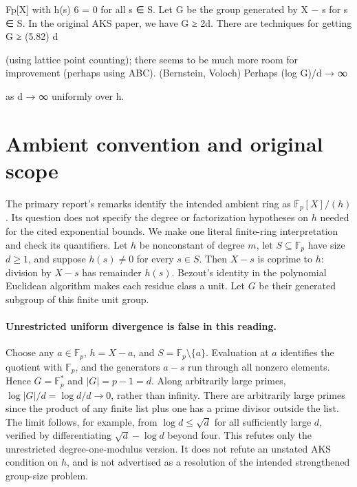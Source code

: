 \documentclass[11pt]{article}
\begin{document}
Fp[X] with h(s) 6 = 0 for all s ∈ S. Let G be the group generated by X − s for s ∈ S. In the original AKS paper, we have G ≥ 2d. There are techniques for getting G ≥ (5.82) d

(using lattice point counting); there seems to be much more room for improvement (perhaps using ABC). (Bernstein, Voloch) Perhaps (log G)/d → ∞

as d → ∞ uniformly over h.

\section{Ambient convention and original scope}
The primary report's remarks identify the intended ambient ring as
$\mathbb F_p[X]/(h)$. Its question does not specify the degree or
factorization hypotheses on $h$ needed for the cited exponential
bounds. We make one literal finite-ring interpretation and check its
quantifiers. Let $h$ be nonconstant of degree $m$, let $S\subseteq
\mathbb F_p$ have size $d\ge1$, and suppose $h(s)\ne0$ for every
$s\in S$. Then $X-s$ is coprime to $h$: division by $X-s$ has
remainder $h(s)$. Bezout's identity in the polynomial Euclidean
algorithm makes each residue class a unit. Let $G$ be their generated
subgroup of this finite unit group.

\paragraph{Unrestricted uniform divergence is false in this reading.}
Choose any $a\in\mathbb F_p$, $h=X-a$, and
$S=\mathbb F_p\setminus\{a\}$. Evaluation at $a$ identifies the
quotient with $\mathbb F_p$, and the generators $a-s$ run through
all nonzero elements. Hence $G=\mathbb F_p^*$ and $|G|=p-1=d$.
Along arbitrarily large primes,
$\log|G|/d=\log d/d\to0$, rather than infinity.
There are arbitrarily large primes since the product of any finite
list plus one has a prime divisor outside the list. The limit follows,
for example, from $\log d\le\sqrt d$ for all sufficiently large $d$,
verified by differentiating $\sqrt d-\log d$ beyond four.
This refutes only the unrestricted degree-one-modulus version. It does
not refute an unstated AKS condition on $h$, and is not advertised as
a resolution of the intended strengthened group-size problem.
\end{document}
